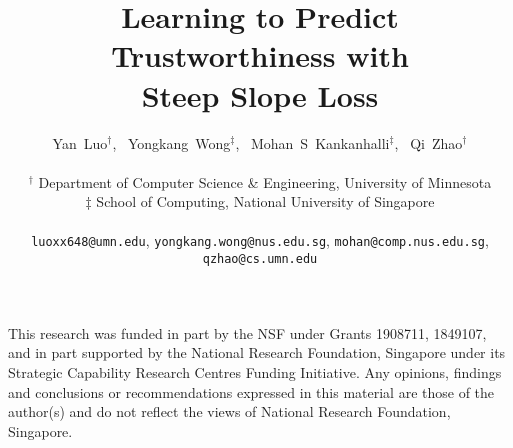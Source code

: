\documentclass{article}
\title{Learning to Predict Trustworthiness with \\Steep Slope Loss}
\author{
    Yan~Luo$^\dagger$, \ Yongkang~Wong$^\ddagger$, \ Mohan~S~Kankanhalli$^\ddagger$, \ Qi~Zhao$^\dagger$ \\
    \vspace{-2ex}\\
    $^\dagger$ Department of Computer Science \& Engineering, University of Minnesota\\
    $\ddagger$ School of Computing, National University of Singapore \\
    \vspace{-2ex}\\
    {\small \texttt{luoxx648@umn.edu}, \texttt{yongkang.wong@nus.edu.sg}, \texttt{mohan@comp.nus.edu.sg}, \texttt{qzhao@cs.umn.edu} }
}
\begin{document}
\maketitle










\begin{ack}
This research was funded in part by the NSF under Grants 1908711, 1849107, and in part supported by the National Research Foundation, Singapore under its Strategic Capability Research Centres Funding Initiative. Any opinions, findings and conclusions or recommendations expressed in this material are those of the author(s) and do not reflect the views of National Research Foundation, Singapore.
\end{ack}




%
%
 

% 

\newpage

\end{document}
